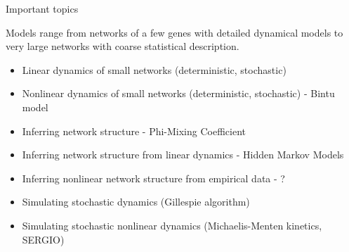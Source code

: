 \documentclass[aspectratio=1610]{beamer}					%
\begin{document}
\begin{frame}{Important topics}

Models range from networks of a few genes with detailed dynamical models to very large networks with coarse statistical description.
\vspace{0.2in}

\begin{itemize}
\item Linear dynamics of small networks (deterministic, stochastic)
\item Nonlinear dynamics of small networks (deterministic, stochastic) - Bintu model
\item Inferring network structure - Phi-Mixing Coefficient
\item Inferring network structure from linear dynamics - Hidden Markov Models
\item Inferring nonlinear network structure from empirical data - ?
\item Simulating stochastic dynamics (Gillespie algorithm)
\item Simulating stochastic nonlinear dynamics (Michaelis-Menten kinetics, SERGIO)
\end{itemize}


\end{frame}
\end{document}
